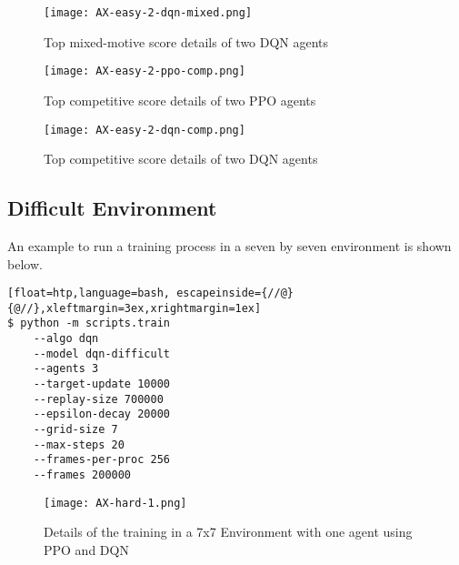 \newpage
\vfill
\begin{figure}
    \centering
    \texttt{[image: AX-easy-2-dqn-mixed.png]}\\
    \caption[Training Details of Top DQN Mixed-Motive Executions]{Top mixed-motive score details of two DQN agents}\label{fig:ax-easy-2-dqn-mixed}
\end{figure}
\vfill
\clearpage


\newpage
\vfill
\begin{figure}
    \centering
    \texttt{[image: AX-easy-2-ppo-comp.png]}\\
    \caption[Training Details of Top PPO Competitive Executions]{Top competitive score details of two PPO agents}\label{fig:ax-easy-2-ppo-comp}
\end{figure}
\vfill
\clearpage


\newpage
\vfill
\begin{figure}
    \centering
    \texttt{[image: AX-easy-2-dqn-comp.png]}\\
    \caption[Training Details of Top DQN Competitive Executions]{Top competitive score details of two DQN agents}\label{fig:ax-easy-2-dqn-comp}
\end{figure}
\vfill
\clearpage

\subsection{Difficult Environment}
An example to run a training process in a seven by seven environment is shown below.

\begin{lstlisting}[float=htp,language=bash, escapeinside={//@}{@//},xleftmargin=3ex,xrightmargin=1ex]
$ python -m scripts.train 
    --algo dqn 
    --model dqn-difficult
    --agents 3
    --target-update 10000 
    --replay-size 700000 
    --epsilon-decay 20000
    --grid-size 7 
    --max-steps 20 
    --frames-per-proc 256
    --frames 200000
\end{lstlisting}

\newpage
\vfill
\begin{figure}
    \centering
    \texttt{[image: AX-hard-1.png]}\\
    \caption[PPO and DQN Training Details with One Agent in a 7x7 Environment]{Details of the training  in a 7x7 Environment with one agent using PPO and DQN}\label{fig:ax-hard-1}
\end{figure}
\vfill
\clearpage


